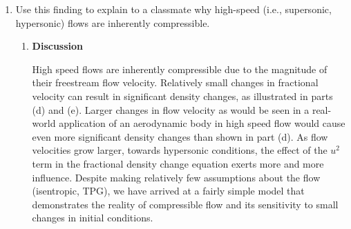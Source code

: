 \documentclass[12pt,letterpaper]{article}
\begin{document}
\begin{enumerate}[label=(\alph*)]
		\item Use this finding to explain to a classmate why high-speed (i.e., supersonic, hypersonic) flows are inherently compressible.
		
		\begin{enumerate}[label=\arabic*.]

			\item{\textbf{Discussion}} \\
			High speed flows are inherently compressible due to the magnitude of their freestream flow velocity. Relatively small changes in fractional velocity can result in significant density changes, as illustrated in parts (d) and (e). Larger changes in flow velocity as would be seen in a real-world application of an aerodynamic body in high speed flow would cause even more significant density changes than shown in part (d). As flow velocities grow larger, towards hypersonic conditions, the effect of the $u^2$ term in the fractional density change equation exerts more and more influence. Despite making relatively few assumptions about the flow (isentropic, TPG), we have arrived at a fairly simple model that demonstrates the reality of compressible flow and its sensitivity to small changes in initial conditions.
		\end{enumerate}
		
		
	\end{enumerate}


	\newpage
	
\end{document}
